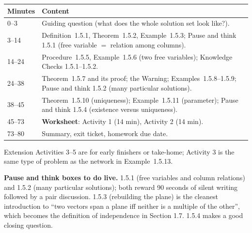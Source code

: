 \documentclass[11pt]{article}
\begin{document}
\begin{tabular}{@{}p{1.1in}p{4.6in}@{}}\toprule
Minutes & Content\\\midrule
0--3 & Guiding question (what does the whole solution set look like?).\\
3--14 & Definition~1.5.1, Theorem~1.5.2, Example~1.5.3; Pause and think 1.5.1 (free variable $=$ relation among columns).\\
14--24 & Procedure~1.5.5, Example~1.5.6 (two free variables); Knowledge Checks 1.5.1--1.5.2.\\
24--38 & Theorem~1.5.7 and its proof; the Warning; Examples~1.5.8--1.5.9; Pause and think 1.5.2 (many particular solutions).\\
38--45 & Theorem~1.5.10 (uniqueness); Example~1.5.11 (parameter); Pause and think 1.5.4 (existence versus uniqueness).\\
45--73 & \textbf{Worksheet}: Activity 1 (14 min), Activity 2 (14 min).\\
73--80 & Summary, exit ticket, homework due date.\\\bottomrule
\end{tabular}

Extension Activities 3--5 are for early finishers or take-home; Activity 3 is the same type of problem as the network in Example~1.5.13.

\begin{tip}
\textbf{Pause and think boxes to do live.} 1.5.1 (free variables and column relations) and 1.5.2 (many particular solutions); both reward 90 seconds of silent writing followed by a pair discussion. 1.5.3 (rebuilding the plane) is the cleanest introduction to ``two vectors span a plane iff neither is a multiple of the other'', which becomes the definition of independence in Section 1.7. 1.5.4 makes a good closing question.
\end{tip}
\end{document}
